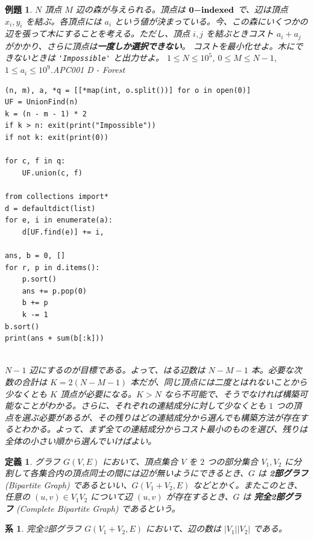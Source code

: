 \documentclass[12pt, a4j]{ltjsarticle}
\newtheorem{defi}[thm]{定義}
\newtheorem{cor}[thm]{系}
\newtheorem{exm}[thm]{例題}
\newcommand*{\SS}{\vspace{1cm}}
\newcommand{\bm}[1]{{\mbox{\boldmath $#1$}}}
\begin{document}
\SS

\begin{exm} $N$ 頂点 $M$ 辺の森が与えられる。頂点は $\bm{0{\rm -indexed}}$ \upshape で、辺は頂点 $x_i,y_i$ を結ぶ。各頂点には $a_i$ という値が決まっている。今、この森にいくつかの辺を張って木にすることを考える。ただし、頂点 $i,j$ を結ぶときコスト $a_i+a_j$ がかかり、さらに頂点は{\bf 一度しか選択できない}。 コストを最小化せよ。木にできないときは \lstinline{'Impossible'} と出力せよ。
$1\le N\le 10^5$, $0\le M\le N-1$, $1\le a_i\le 10^9$.\quad APC001 D - Forest\\
\begin{lstlisting}
(n, m), a, *q = [[*map(int, o.split())] for o in open(0)]
UF = UnionFind(n)
k = (n - m - 1) * 2
if k > n: exit(print("Impossible"))
if not k: exit(print(0))

for c, f in q:
    UF.union(c, f)

from collections import*
d = defaultdict(list)
for e, i in enumerate(a):
    d[UF.find(e)] += i,

ans, b = 0, []
for r, p in d.items():
    p.sort()
    ans += p.pop(0)
    b += p
    k -= 1
b.sort()
print(ans + sum(b[:k]))
\end{lstlisting}\quad\\
$N-1$ 辺にするのが目標である。よって、はる辺数は $N-M-1$ 本。必要な次数の合計は $K=2(N-M-1)$ 本だが、同じ頂点には二度とはれないことから少なくとも $K$ 頂点が必要になる。$K > N$ なら不可能で、そうでなければ構築可能なことがわかる。さらに、それぞれの連結成分に対して少なくとも $1$ つの頂点を選ぶ必要があるが、その残りはどの連結成分から選んでも構築方法が存在するとわかる。よって、まず全ての連結成分からコスト最小のものを選び、残りは全体の小さい順から選んでいけばよい。
\end{exm}

\SS

\begin{defi}
グラフ $G(V,E)$ において、頂点集合 $V$ を $2$ つの部分集合 $V_1,V_2$ に分割して各集合内の頂点同士の間には辺が無いようにできるとき、$G$ は {\bf 2部グラフ} (Bipartite Graph) であるといい、$G(V_1+V_2,E)$ などとかく。またこのとき、任意の $(u,v)\in V_1V_2$ について辺 $(u,v)$ が存在するとき、$G$ は {\bf 完全2部グラフ} (Complete Bipartite Graph) であるという。
\end{defi}

\SS

\begin{cor}
完全2部グラフ $G(V_1+V_2,E)$ において、辺の数は $|V_1||V_2|$ である。
\end{cor}
\end{document}
